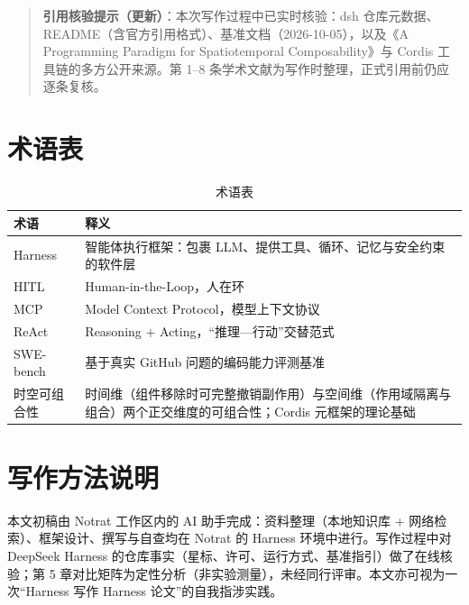 \documentclass[11pt,a4paper]{ctexart}
\begin{document}
\begin{quote}
\small\textbf{引用核验提示（更新）}：本次写作过程中已实时核验：dsh 仓库元数据、README（含官方引用格式）、基准文档（2026-10-05），以及《A Programming Paradigm for Spatiotemporal Composability》与 Cordis 工具链的多方公开来源。第 1--8 条学术文献为写作时整理，正式引用前仍应逐条复核。
\end{quote}

\appendix

\section{术语表}

\begin{table}[htbp]
  \centering
  \small
  \caption{术语表}
  \label{tab:glossary}
  \begin{tabularx}{\textwidth}{l X}
    \toprule
    术语 & 释义 \\
    \midrule
    Harness & 智能体执行框架：包裹 LLM、提供工具、循环、记忆与安全约束的软件层 \\
    HITL & Human-in-the-Loop，人在环 \\
    MCP & Model Context Protocol，模型上下文协议 \\
    ReAct & Reasoning + Acting，“推理—行动”交替范式 \\
    SWE-bench & 基于真实 GitHub 问题的编码能力评测基准 \\
    时空可组合性 & 时间维（组件移除时可完整撤销副作用）与空间维（作用域隔离与组合）两个正交维度的可组合性；Cordis 元框架的理论基础 \\
    \bottomrule
  \end{tabularx}
\end{table}

\section{写作方法说明}

本文初稿由 Notrat 工作区内的 AI 助手完成：资料整理（本地知识库 + 网络检索）、框架设计、撰写与自查均在 Notrat 的 Harness 环境中进行。写作过程中对 DeepSeek Harness 的仓库事实（星标、许可、运行方式、基准指引）做了在线核验；第 5 章对比矩阵为定性分析（非实验测量），未经同行评审。本文亦可视为一次“Harness 写作 Harness 论文”的自我指涉实践。
\end{document}
